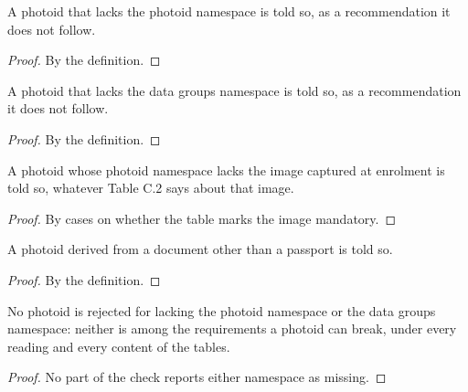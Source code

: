 \begin{theorem}
  \label{thm:advises-photoid-namespace}
  A photoid that lacks the photoid namespace is told so, as a recommendation
  it does not follow.
\end{theorem}
\begin{proof}
  By the definition.
\end{proof}

\begin{theorem}
  \label{thm:advises-datagroups-namespace}
  A photoid that lacks the data groups namespace is told so, as a
  recommendation it does not follow.
\end{theorem}
\begin{proof}
  By the definition.
\end{proof}

\begin{theorem}
  \label{thm:advises-enrolment-portrait}
  A photoid whose photoid namespace lacks the image captured at enrolment is
  told so, whatever Table C.2 says about that image.
\end{theorem}
\begin{proof}
  By cases on whether the table marks the image mandatory.
\end{proof}

\begin{theorem}
  \label{thm:advises-source-document}
  A photoid derived from a document other than a passport is told so.
\end{theorem}
\begin{proof}
  By the definition.
\end{proof}

\begin{theorem}
  \label{thm:absent-recommended-namespace}
  No photoid is rejected for lacking the photoid namespace or the data groups
  namespace: neither is among the requirements a photoid can break, under
  every reading and every content of the tables.
\end{theorem}
\begin{proof}
  No part of the check reports either namespace as missing.
\end{proof}

